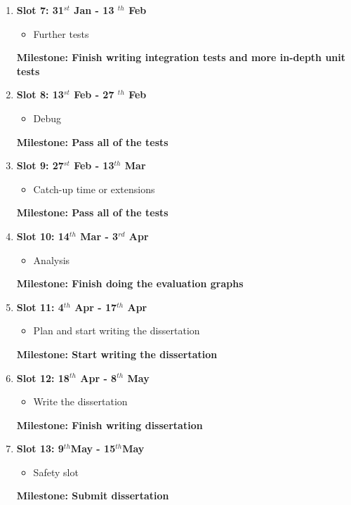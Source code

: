 \begin{enumerate}
\begin{itemize}
		\item Buffer time: catch up or start doing the extensions
		\item Write progress report
	\end{itemize}
	{\bf Milestone: Submit progress report} 
\item {\bf Slot 7: 31$^{st}$ Jan - 13 $^{th}$ Feb}
	\begin{itemize}
		\item Further tests
	\end{itemize}
	{\bf Milestone: Finish writing integration tests and more in-depth unit tests} 
\item {\bf Slot 8: 13$^{st}$ Feb - 27 $^{th}$ Feb}
	\begin{itemize}
		\item Debug
	\end{itemize}
	{\bf Milestone: Pass all of the tests}
\item {\bf Slot 9: 27$^{st}$ Feb - 13$^{th}$ Mar}
	\begin{itemize}
		\item Catch-up time or extensions
	\end{itemize}
	{\bf Milestone: Pass all of the tests} 
\item {\bf Slot 10: 14$^{th}$ Mar - 3$^{rd}$ Apr}
	\begin{itemize}
		\item Analysis
	\end{itemize}
	{\bf Milestone: Finish doing the evaluation graphs} 
\item {\bf Slot 11: 4$^{th}$ Apr - 17$^{th}$ Apr}
	\begin{itemize}
		\item Plan and start writing the dissertation
	\end{itemize}
	{\bf Milestone: Start writing the dissertation}
\item {\bf Slot 12: 18$^{th}$ Apr - 8$^{th}$ May}
	\begin{itemize}
		\item Write the dissertation
	\end{itemize}
	{\bf Milestone: Finish writing dissertation}	 
\item {\bf Slot 13: 9$^{th}$May  - 15$^{th}$May}
	\begin{itemize}
		\item Safety slot
	\end{itemize}
	{\bf Milestone: Submit dissertation} 
\end{enumerate}



 

